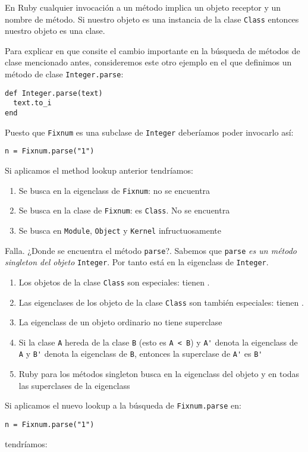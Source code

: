 En Ruby cualquier invocación a un método implica
un objeto receptor y un nombre de método.
Si nuestro objeto es una instancia de la clase
\verb|Class| entonces nuestro objeto es una clase.

Para explicar en que consite 
el cambio importante en la búsqueda 
de métodos de clase mencionado 
antes, consideremos este otro ejemplo
en el que definimos un método de clase 
\verb|Integer.parse|:
\begin{verbatim}
def Integer.parse(text)
  text.to_i
end
\end{verbatim}
Puesto que \verb|Fixnum| es una subclase de 
\verb|Integer| deberíamos poder invocarlo así:
\begin{verbatim}
n = Fixnum.parse("1")
\end{verbatim}
Si aplicamos el method lookup anterior tendríamos:
\begin{enumerate}
\item
Se busca en la eigenclass de \verb|Fixnum|: no se encuentra
\item 
Se busca en la clase de \verb|Fixnum|: es \verb|Class|.
No se encuentra
\item Se busca en \verb|Module|, \verb|Object| y \verb|Kernel| 
infructuosamente 
\end{enumerate}

Falla. ¿Donde se encuentra el método \verb|parse|?.
Sabemos que \verb|parse| \emph{es un método singleton del objeto} \verb|Integer|.
Por tanto está en la eigenclass de \verb|Integer|.

\begin{enumerate}
\item
Los objetos de la clase \verb|Class|
son especiales: tienen .
\item
Las eigenclases de los objeto de la clase \verb|Class|
son también especiales: tienen .
\item
La eigenclass de un objeto ordinario no tiene superclase
\item
Si la clase \verb|A| hereda de la clase \verb|B| (esto es \verb|A < B|)
y \verb|A'| denota la eigenclass de \verb|A|
y \verb|B'| denota la eigenclass de \verb|B|,
entonces la superclase de \verb|A'| es \verb|B'|
\item
Ruby para los métodos singleton busca en la eigenclass del objeto y en todas las superclases de la eigenclass 
\end{enumerate}
Si aplicamos el nuevo lookup  a la búsqueda de \verb|Fixnum.parse| en:
\begin{verbatim}
n = Fixnum.parse("1")
\end{verbatim}
tendríamos:


